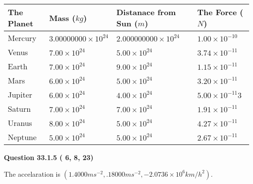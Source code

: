 \documentclass[12pt]{article}
\begin{document}
 
\begin{tabular}{|l|l|l|l|}
\hline
The Planet & Mass ($kg$) & Distanace from Sun ($m$) & The Force ($N$)\\
\hline
Mercury  &
           $ %
3.00000000 \times 10^{24}  $   &
             $ %
2.000000000 \times 10^{24}$    & $ %
1.00 \times 10^{-10} $
\\  \hline
Venus    &
           $  %
7.00 \times 10^{24}  $     &
             $ %
5.00 \times 10^{24} $    & $ %
3.74 \times 10^{-11} $
\\  \hline
Earth    &
           $  %
7.00 \times 10^{24}$     &
             $ %
9.00 \times 10^{24} $    & $ %
1.15 \times 10^{-11} $
\\   \hline
Mars     &
           $  %
6.00 \times 10^{24} $     &
             $ %
5.00 \times 10^{24}$    & $ %
3.20 \times 10^{-11} $
\\   \hline
Jupiter  &
           $  %
6.00 \times 10^{24}  $    &
             $ %
4.00 \times 10^{24} $    & $ %
5.00 \times 10^{-11}3 $
\\  \hline
Saturn   &
           $  %
7.00 \times 10^{24}   $    &
             $ %
7.00 \times 10^{24}  $    & $ %
1.91 \times 10^{-11} $
\\  \hline
Uranus   &
           $  %
8.00 \times 10^{24} $    &
             $ %
5.00 \times 10^{24}$    & $ %
4.27 \times 10^{-11} $
\\  \hline
Neptune  &
           $  %
5.00 \times 10^{24}  $    &
             $ %
5.00 \times 10^{24} $    & $ %
2.67 \times 10^{-11} $
\\  \hline
 
\end{tabular}
 
 
 
 
  
\vspace{0.2in}
  
{\textbf{\Large{Question
33.1.5 
 (          6,          8,         23)
}}}
  
  
 
 
\noindent{}
 
 
The accelaration is
$(
1.4000ms^{-2},
.18000ms^{-2},
-2.0736 \times 10^{6}km/h^2
).
$
 
 
 
 
  
\vspace{0.2in}
  
\end{document}
